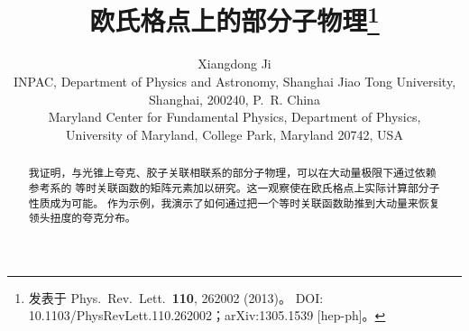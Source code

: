 \documentclass[11pt]{ctexart}
\title{欧氏格点上的部分子物理\thanks{发表于 Phys.\ Rev.\ Lett.\ \textbf{110}, 262002 (2013)。
DOI: 10.1103/PhysRevLett.110.262002；arXiv:1305.1539 [hep-ph]。}}
\author{Xiangdong Ji\\[4pt]
\normalsize INPAC, Department of Physics and Astronomy, Shanghai Jiao Tong University,\\
\normalsize Shanghai, 200240, P.~R. China\\[2pt]
\normalsize Maryland Center for Fundamental Physics, Department of Physics,\\
\normalsize University of Maryland, College Park, Maryland 20742, USA}
\date{}
\begin{document}
\maketitle

\begin{abstract}
我证明，与光锥上夸克、胶子关联相联系的部分子物理，可以在大动量极限下通过依赖参考系的
等时关联函数的矩阵元素加以研究。这一观察使在欧氏格点上实际计算部分子性质成为可能。
作为示例，我演示了如何通过把一个等时关联函数助推到大动量来恢复领头扭度的夸克分布。
\end{abstract}



\end{document}
